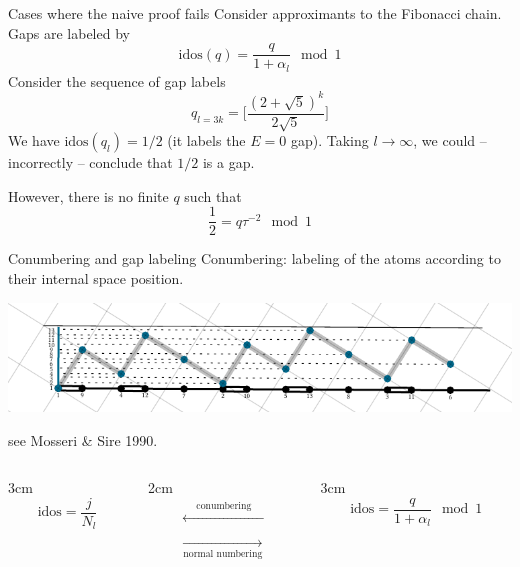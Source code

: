 \documentclass[xcolor=x11names,compress,professionalfonts]{beamer}
\renewcommand{\(}{\begin{columns}}
\renewcommand{\)}{\end{columns}}
\newcommand{\<}[1]{\begin{column}{#1}}
\renewcommand{\>}{\end{column}}
\newcommand{\id}{\ensuremath{\text{idos}}}
\begin{document}
\begin{frame}{Cases where the naive proof fails}
Consider approximants to the Fibonacci chain.
Gaps are labeled by
\[
	\id(q) = \frac{q}{1+\alpha_l} \mod 1
\]
Consider the sequence of gap labels
\[
	q_{l = 3k} = \Bigg[ \frac{(2+\sqrt{5})^k}{2 \sqrt{5}}\Bigg]
\]
We have $\id(q_l) = 1/2$ (it labels the $E=0$ gap).
Taking $l \to \infty$, we could -- incorrectly -- conclude that $1/2$ is a gap.

However, there is no finite $q$ such that
\[
	\frac{1}{2} = q \tau^{-2} \mod 1
\]

\end{frame}

\begin{frame}{Conumbering and gap labeling}
Conumbering: labeling of the atoms according to their internal space position.

{  \centering
     \includegraphics[scale=.9]{img/cut_and_project_perp_projections.pdf}

}
{\flushright
\small{see Mosseri \& Sire 1990.}

}
\(
\<{3cm}
\[
	\id = \frac{j}{N_l}
\]
\>

\<{2cm}
\begin{align*}
	\xleftarrow[]{\text{~~~~conumbering~~~~}} \\
	\xrightarrow[\text{normal numbering}]{}
\end{align*}
\>

\<{3cm}
\[
	\id = \frac{q}{1+\alpha_l} \mod 1
\]
\>
\)

\end{frame}
\end{document}
